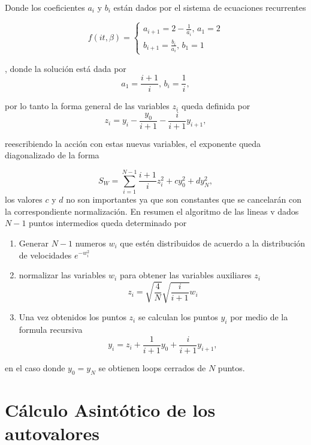 Donde los coeficientes $a_i$ y $b_i$ están dados por el sistema de ecuaciones recurrentes

\[ 
f   ( i t ,\beta )=
\begin{cases} 
	  a_{i+1} = 2 - \frac{1}{a_i},  \, a _1 = 2
\\
	  	  b_{i+1} = \frac{b _i}{a _i},  \, b _1 = 1
   \end{cases}   
\] 

, donde la solución está dada por
\begin{equation}
a _1 = \frac{i+1}{i} , \, b_i = \frac{1}{i} ,
\end{equation}

por lo tanto la forma general de las variables $z _i$ queda definida por
\begin{equation}
z _i = y _i - \frac{y_0}{i+1} - \frac{i}{i+1} y _{i+1} ,
\end{equation}

reescribiendo la acción con estas nuevas variables, el exponente queda diagonalizado de la forma

\begin{equation}
S _{W}  = \sum _{i = 1} ^{N-1} \frac{i +1}{i} z _i ^2 + c y _0 ^2 + d y _N ^2
, 
\end{equation}
los valores $c$ y $d$ no son importantes ya que son constantes que se cancelarán con la correspondiente normalización.
En resumen el algoritmo de las lineas v dados $N-1$ puntos intermedios queda determinado por 
\begin{enumerate}
\item Generar $N-1$ numeros $w_i$ que estén distribuidos de acuerdo a la distribución de velocidades $e^{- w _{i} ^2}$
\item normalizar las variables $w _i$ para obtener las variables auxiliares $z _i$
	\begin{equation}
	z _i = \sqrt{\frac{4}{N}} \sqrt{\frac{i}{i+1}} w _i
	\end{equation}

\item Una vez obtenidos los puntos $ z_i$ se calculan los puntos $ y_i$ por medio de la formula recursiva
	\begin{equation}
	y _i = z _i + \frac{1}{i+1} y_0 + \frac{i}{i+1} y _{i+1} ,
	\end{equation}
\end{enumerate}
en el caso donde $y_0 = y _N$ se obtienen loops cerrados de $N$ puntos.

\section{Cálculo Asintótico de los autovalores}\label{seq.2.asin}


